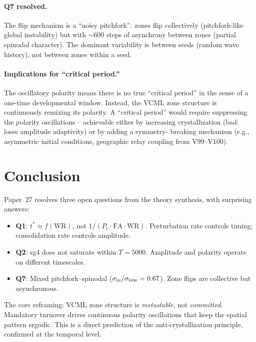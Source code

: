 \documentclass[11pt,a4paper]{article}
\begin{document}
\paragraph{Q7 resolved.}
The flip mechanism is a ``noisy pitchfork'': zones flip collectively
(pitchfork-like global instability) but with $\sim 600$ steps of asynchrony
between zones (partial spinodal character).  The dominant variability is
between seeds (random wave history), not between zones within a seed.

\paragraph{Implications for ``critical period.''}
The oscillatory polarity means there is no true ``critical period'' in the
sense of a one-time developmental window.  Instead, the VCML zone structure
is continuously remixing its polarity.  A ``critical period'' would require
suppressing the polarity oscillations -- achievable either by increasing
crystallization (bad: loses amplitude adaptivity) or by adding a symmetry-
breaking mechanism (e.g., asymmetric initial conditions, geographic relay
coupling from V99--V100).

\section{Conclusion}

Paper~27 resolves three open questions from the theory synthesis, with
surprising answers:
\begin{itemize}
  \item \textbf{Q1}: $t^* \approx f(\mathrm{WR})$, not $1/(P_c\cdot\mathrm{FA}\cdot\mathrm{WR})$.
        Perturbation rate controls timing; consolidation rate controls amplitude.
  \item \textbf{Q2}: sg4 does not saturate within $T=5000$.
        Amplitude and polarity operate on different timescales.
  \item \textbf{Q7}: Mixed pitchfork--spinodal ($\sigma_{\rm in}/\sigma_{\rm btw} = 0.67$).
        Zone flips are collective but asynchronous.
\end{itemize}

The core reframing: VCML zone structure is \emph{metastable}, not
\emph{committed}.  Mandatory turnover drives continuous polarity oscillations
that keep the spatial pattern ergodic.  This is a direct prediction of the
anti-crystallization principle, confirmed at the temporal level.
\end{document}
